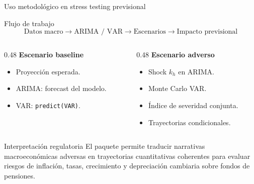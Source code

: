 \documentclass[10pt,aspectratio=169]{beamer}
\begin{document}
\begin{frame}{Uso metodológico en stress testing previsional}

\begin{block}{Flujo de trabajo}
\[
\text{Datos macro}
\rightarrow
\text{ARIMA / VAR}
\rightarrow
\text{Escenarios}
\rightarrow
\text{Impacto previsional}
\]

\end{block}

\vspace{0.2cm}

\begin{columns}
\begin{column}{0.48\textwidth}
\textbf{Escenario baseline}
\begin{itemize}
  \item Proyección esperada.
  \item ARIMA: forecast del modelo.
  \item VAR: \texttt{predict(VAR)}.
\end{itemize}
\end{column}

\begin{column}{0.48\textwidth}
\textbf{Escenario adverso}
\begin{itemize}
  \item Shock $k_h$ en ARIMA.
  \item Monte Carlo VAR.
  \item Índice de severidad conjunta.
  \item Trayectorias condicionales.
\end{itemize}
\end{column}
\end{columns}

\vspace{0.3cm}

\begin{alertblock}{Interpretación regulatoria}
El paquete permite traducir narrativas macroeconómicas adversas en trayectorias cuantitativas coherentes para evaluar riesgos de inflación, tasas, crecimiento y depreciación cambiaria sobre fondos de pensiones.
\end{alertblock}

\end{frame}
\end{document}

